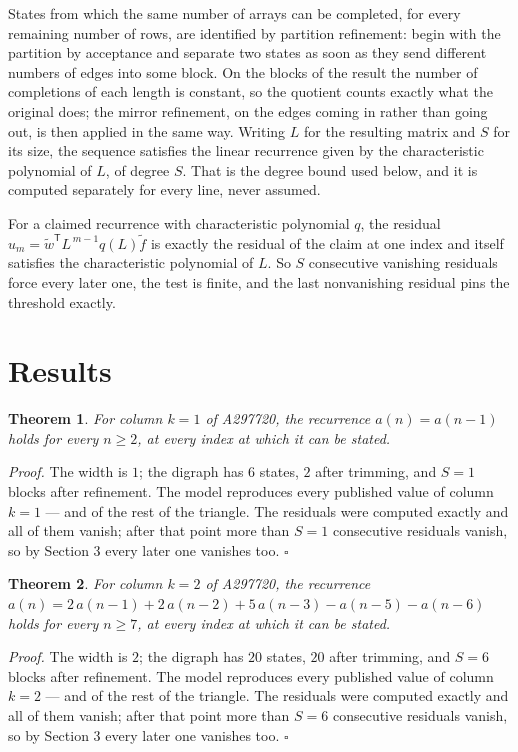 \documentclass[11pt]{article}
\newtheorem{theorem}{Theorem}
\theoremstyle{definition}
\begin{document}
States from which the same number of arrays can be completed, for every remaining number of rows, are identified by partition refinement: begin with the partition by acceptance and separate two states as soon as they send different numbers of edges into some block. On the blocks of the result the number of completions of each length is constant, so the quotient counts exactly what the original does; the mirror refinement, on the edges coming in rather than going out, is then applied in the same way. Writing $L$ for the resulting matrix and $S$ for its size, the sequence satisfies the linear recurrence given by the characteristic polynomial of $L$, of degree $S$. That is the degree bound used below, and it is computed separately for every line, never assumed.

For a claimed recurrence with characteristic polynomial $q$, the residual $u_m = \tilde w^{\mathsf T}L^{\,m-1}q(L)\tilde f$ is exactly the residual of the claim at one index and itself satisfies the characteristic polynomial of $L$. So $S$ consecutive vanishing residuals force every later one, the test is finite, and the last nonvanishing residual pins the threshold exactly.

\section{Results}

\begin{theorem} For column $k = 1$ of A297720, the recurrence $a(n) = a(n-1)$ holds for every $n \ge 2$, at every index at which it can be stated.\end{theorem}

{\itshape Proof.} The width is $1$; the digraph has $6$ states, $2$ after trimming, and $S = 1$ blocks after refinement. The model reproduces every published value of column $k = 1$ --- and of the rest of the triangle. The residuals were computed exactly and all of them vanish; after that point more than $S = 1$ consecutive residuals vanish, so by Section 3 every later one vanishes too. $\square$

\begin{theorem} For column $k = 2$ of A297720, the recurrence $a(n) = 2\,a(n-1) + 2\,a(n-2) + 5\,a(n-3) - a(n-5) - a(n-6)$ holds for every $n \ge 7$, at every index at which it can be stated.\end{theorem}

{\itshape Proof.} The width is $2$; the digraph has $20$ states, $20$ after trimming, and $S = 6$ blocks after refinement. The model reproduces every published value of column $k = 2$ --- and of the rest of the triangle. The residuals were computed exactly and all of them vanish; after that point more than $S = 6$ consecutive residuals vanish, so by Section 3 every later one vanishes too. $\square$
\end{document}
